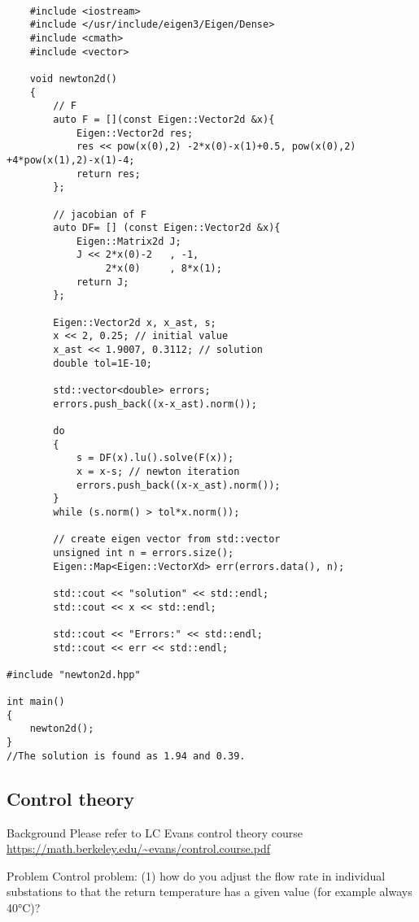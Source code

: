 \documentclass[xcolor=dvipsnames]{beamer}
\begin{document}
{
\begin{frame}[fragile,shrink=30]
	\lstset{language=C++}
\begin{lstlisting}

	#include <iostream>
	#include </usr/include/eigen3/Eigen/Dense>
	#include <cmath>
	#include <vector>

	void newton2d()
	{
		// F
		auto F = [](const Eigen::Vector2d &x){ 
	   		Eigen::Vector2d res;
			res << pow(x(0),2) -2*x(0)-x(1)+0.5, pow(x(0),2) +4*pow(x(1),2)-x(1)-4;
			return res;
		};

		// jacobian of F
		auto DF= [] (const Eigen::Vector2d &x){
			Eigen::Matrix2d J;
			J << 2*x(0)-2	, -1, 
			  	 2*x(0)		, 8*x(1);
		  	return J;
		};	

		Eigen::Vector2d x, x_ast, s;
		x << 2, 0.25; // initial value
		x_ast << 1.9007, 0.3112; // solution
	   	double tol=1E-10;

		std::vector<double> errors;
		errors.push_back((x-x_ast).norm());

		do
		{
			s = DF(x).lu().solve(F(x));
		   	x = x-s; // newton iteration
			errors.push_back((x-x_ast).norm());
		}
		while (s.norm() > tol*x.norm());

		// create eigen vector from std::vector
		unsigned int n = errors.size();
		Eigen::Map<Eigen::VectorXd> err(errors.data(), n);

		std::cout << "solution" << std::endl;
		std::cout << x << std::endl;
		
		std::cout << "Errors:" << std::endl;
		std::cout << err << std::endl;

#include "newton2d.hpp"
  
int main()
{
	newton2d();
}
//The solution is found as 1.94 and 0.39.
\end{lstlisting}
\end{frame}

\subsection{Control theory}

\begin{frame}{Background}
	Please refer to LC Evans control theory course \url{https://math.berkeley.edu/~evans/control.course.pdf}
\end{frame}

\begin{frame}{Problem}
	Control problem: (1) how do you adjust the flow rate in individual substations to that the return temperature has a given value (for example always 40°C)?
\end{frame}

}
\end{document}
